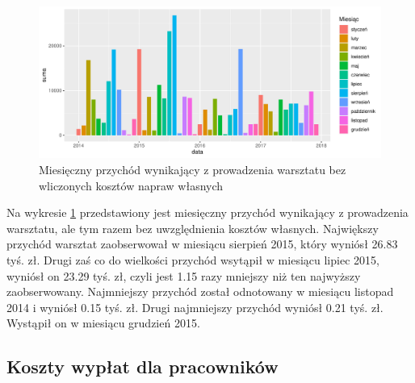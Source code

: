 \documentclass{article}\usepackage[]{graphicx}\usepackage[]{xcolor}
\makeatletter
\def\maxwidth{ %
  \ifdim\Gin@nat@width>\linewidth
    \linewidth
  \else
    \Gin@nat@width
  \fi
}
\newenvironment{knitrout}{}{} %
\makeatother
\begin{document}
\begin{knitrout}
\color{fgcolor}\begin{figure}[H]

{\centering \includegraphics[width=\maxwidth]{figure/fig_uslugi2-1} 

}

\caption[Miesięczny przychód wynikający z prowadzenia warsztatu bez wliczonych kosztów napraw własnych]{Miesięczny przychód wynikający z prowadzenia warsztatu bez wliczonych kosztów napraw własnych}\label{fig:fig_uslugi2}
\end{figure}

\end{knitrout}

Na wykresie \ref{fig:fig_uslugi2} przedstawiony jest miesięczny przychód wynikający z prowadzenia warsztatu, ale tym razem bez uwzględnienia kosztów własnych. 
Największy przychód warsztat zaobserwował w miesiącu sierpień 2015, który wyniósł 26.83 tyś. zł.
Drugi zaś co do wielkości przychód wsytąpił w miesiącu lipiec 2015, wyniósł on 23.29 tyś. zł, czyli jest 1.15 razy mniejszy niż ten najwyższy zaobserwowany.
Najmniejszy przychód został odnotowany w miesiącu listopad 2014 i wyniósł 0.15 tyś. zł. 
Drugi najmniejszy przychód wyniósł 0.21 tyś. zł. Wystąpił on w miesiącu grudzień 2015.

\subsection{Koszty wypłat dla pracowników}
\end{document}
